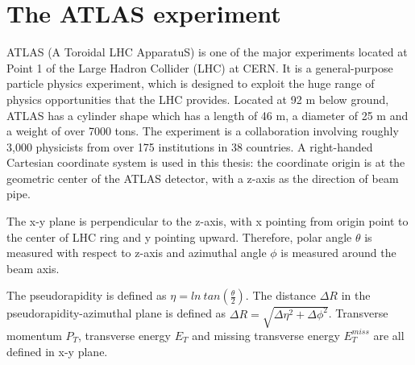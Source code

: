 \chapter{The ATLAS experiment}

\label{ch:atlas}
\par ATLAS (A Toroidal LHC ApparatuS) is one of the major experiments located at Point 1 of the Large Hadron Collider (LHC) at CERN. 
It is a general-purpose particle physics experiment, which is designed to exploit the huge range of physics opportunities that the LHC provides. 
		Located at 92 m below ground, ATLAS has a cylinder shape which has a length of 46 m, a diameter of 25 m and a weight of over 7000 tons.
 The experiment is a collaboration involving roughly 3,000 physicists from over 175 institutions in 38 countries\cite{fact}.
A right-handed Cartesian coordinate system is used in this thesis: the coordinate origin is at the geometric center of the ATLAS detector, with a z-axis as 
the direction of beam pipe.
\par The x-y plane is perpendicular to the z-axis, with x pointing from origin point to the center 
of LHC ring and y pointing upward. Therefore, polar angle $\theta$ is measured with respect to z-axis and azimuthal angle $\phi$ is measured around the beam axis. 
\par The pseudorapidity is defined as $\eta = ln~tan(\frac{\theta}{2})$. The distance $\Delta R$ in the pseudorapidity-azimuthal plane is defined as 
$\Delta R = \sqrt{\Delta\eta^2 + \Delta\phi^2}$. Transverse momentum $P_T$, transverse energy $E_T$ and missing transverse energy $E_T^{miss}$ are all defined in x-y plane.				

